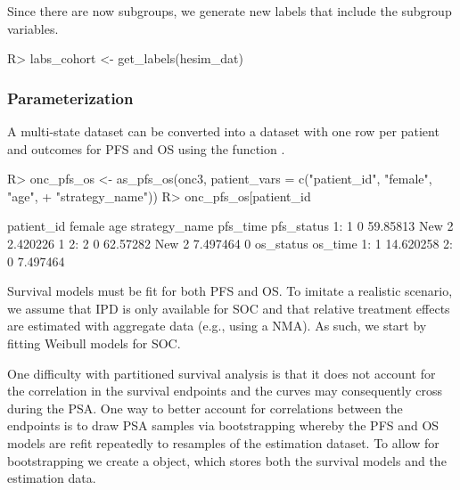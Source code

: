 \documentclass[article, nojss]{jss}\usepackage[]{graphicx}\usepackage[]{color}
\begin{document}
\begin{Schunk}
\end{Schunk}

Since there are now subgroups, we generate new labels that include the subgroup variables.

\begin{Schunk}
\begin{Sinput}
R> labs_cohort <- get_labels(hesim_dat)
\end{Sinput}
\end{Schunk}

\subsubsection{Parameterization}
A multi-state dataset can be converted into a dataset with one row per patient and outcomes for PFS and OS using the function . 

\begin{Schunk}
\begin{Sinput}
R> onc_pfs_os <- as_pfs_os(onc3, patient_vars = c("patient_id", "female", "age", 
+                                                 "strategy_name"))
R> onc_pfs_os[patient_id %
\end{Sinput}
\begin{Soutput}
   patient_id female      age strategy_name pfs_time pfs_status
1:          1      0 59.85813         New 2 2.420226          1
2:          2      0 62.57282         New 2 7.497464          0
   os_status   os_time
1:         1 14.620258
2:         0  7.497464
\end{Soutput}
\end{Schunk}

Survival models must be fit for both PFS and OS. To imitate a realistic scenario, we assume that IPD is only available for SOC and that relative treatment effects are estimated with aggregate data (e.g., using a NMA). As such, we start by fitting Weibull models for SOC. 

One difficulty with partitioned survival analysis is that it does not account for the correlation in the survival endpoints and the curves may consequently cross during the PSA. One way to better account for correlations between the endpoints is to draw PSA samples via bootstrapping whereby the PFS and OS models are refit repeatedly to resamples of the estimation dataset. To allow for bootstrapping we create a  object, which stores both the survival models and the estimation data.
\end{document}
